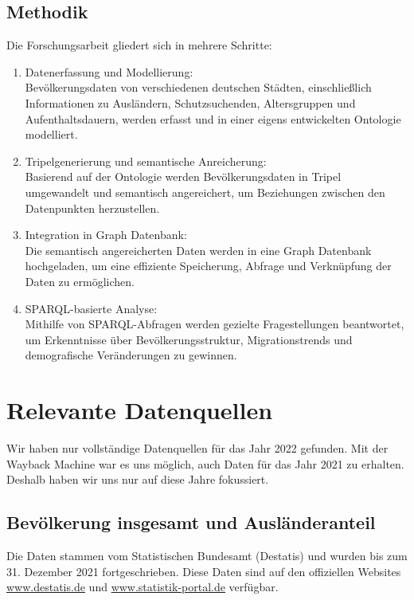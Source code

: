 \documentclass[a4paper, 12pt]{article}
\begin{document}
\subsection{Methodik}
Die Forschungsarbeit gliedert sich in mehrere Schritte:
\begin{enumerate}
    \item Datenerfassung und Modellierung: \\
    Bevölkerungsdaten von verschiedenen deutschen Städten, einschließlich Informationen zu Ausländern, Schutzsuchenden, Altersgruppen und Aufenthaltsdauern, werden erfasst und in einer eigens entwickelten Ontologie modelliert.
    \item Tripelgenerierung und semantische Anreicherung: \\
    Basierend auf der Ontologie werden Bevölkerungsdaten in Tripel umgewandelt und semantisch angereichert, um Beziehungen zwischen den Datenpunkten herzustellen.
    \item Integration in Graph Datenbank: \\
    Die semantisch angereicherten Daten werden in eine Graph Datenbank hochgeladen, um eine effiziente Speicherung, Abfrage und Verknüpfung der Daten zu ermöglichen.
    \item SPARQL-basierte Analyse: \\
    Mithilfe von SPARQL-Abfragen werden gezielte Fragestellungen beantwortet, um Erkenntnisse über Bevölkerungsstruktur, Migrationstrends und demografische Veränderungen zu gewinnen.
\end{enumerate}

\section{Relevante Datenquellen}
Wir haben nur vollständige Datenquellen für das Jahr 2022 gefunden. Mit der Wayback Machine war es uns möglich, auch Daten für das Jahr 2021 zu erhalten. Deshalb haben wir uns nur auf diese Jahre fokussiert.

\subsection{Bevölkerung insgesamt und Ausländeranteil}
Die Daten stammen vom Statistischen Bundesamt (Destatis) und wurden bis zum 31. Dezember 2021 fortgeschrieben. Diese Daten sind auf den offiziellen Websites \href{www.destatis.de}{www.destatis.de} und \href{www.statistik-portal.de}{www.statistik-portal.de} verfügbar.
\end{document}
